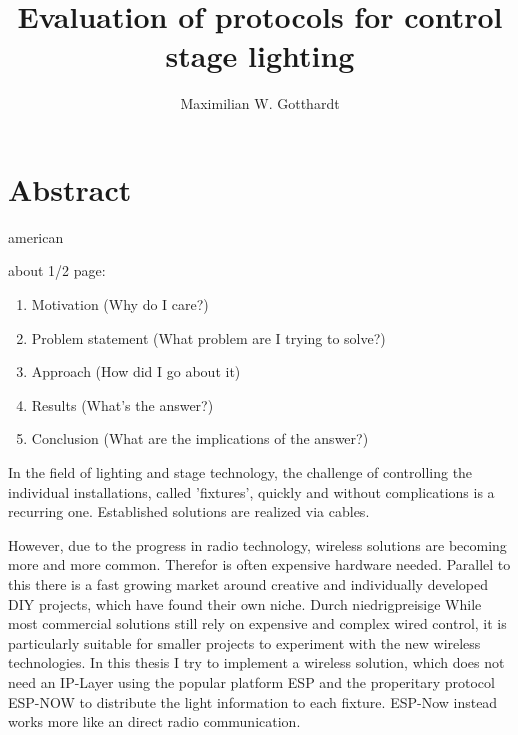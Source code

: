 \documentclass[]{ccs-thesis}
\author{Maximilian W. Gotthardt}
\title{Evaluation of protocols for control stage lighting}
\begin{document}

\maketitle

\thispagestyle{empty}

\cleardoublepage

\chapter*{Abstract}
\begin{otherlanguage*}{american}

about 1/2 page:
\begin{enumerate}
	\item Motivation (Why do I care?)
	\item Problem statement (What problem are I trying to solve?)
	\item Approach (How did I go about it)
	\item Results (What's the answer?)
	\item Conclusion (What are the implications of the answer?)
\end{enumerate}
	

In the field of lighting and stage technology, the challenge of controlling the individual installations, called 'fixtures', quickly and without complications is a recurring one. Established solutions are realized via cables. 

However, due to the progress in radio technology, wireless solutions are becoming more and more common. Therefor is often expensive hardware needed.
Parallel to this there is a fast growing market around creative and individually developed DIY projects, which have found their own niche. Durch niedrigpreisige 
While most commercial solutions still rely on expensive and complex wired control, it is particularly suitable for smaller projects to experiment with the new wireless technologies. 
In this thesis I try to implement a wireless solution, which does not need an IP-Layer using the popular platform ESP and the properitary protocol ESP-NOW to distribute the light information to each fixture. 
ESP-Now instead works more like an direct radio communication.
	
\end{otherlanguage*}
\end{document}

